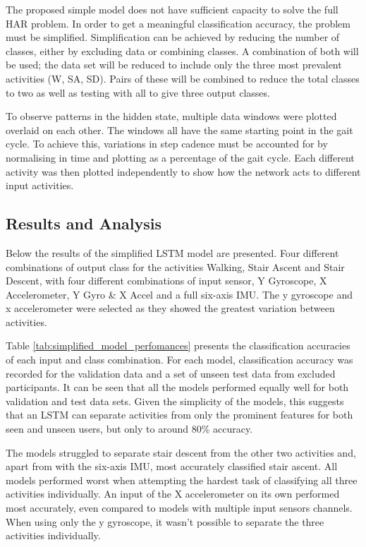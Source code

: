 \documentclass[sensors,article,submit,moreauthors,pdftex]{Definitions/mdpi}
\begin{document}
The proposed simple model does not have sufficient capacity to solve the full HAR problem. In order to get a meaningful classification accuracy, the problem must be simplified. Simplification can be achieved by reducing the number of classes, either by excluding data or combining classes. A combination of both will be used; the data set will be reduced to include only the three most prevalent activities (W, SA, SD). Pairs of these will be combined to reduce the total classes to two as well as testing with all to give three output classes.

To observe patterns in the hidden state, multiple data windows were plotted overlaid on each other. The windows all have the same starting point in the gait cycle. To achieve this, variations in step cadence must be accounted for by normalising in time and plotting as a percentage of the gait cycle. Each different activity was then plotted independently to show how the network acts to different input activities.

\subsection{Results and Analysis}
Below the results of the simplified LSTM model are presented. Four different combinations of output class for the activities Walking, Stair Ascent and Stair Descent, with four different combinations of input sensor, Y Gyroscope, X Accelerometer, Y Gyro \& X Accel and a full six-axis IMU. The y gyroscope and x accelerometer were selected as they showed the greatest variation between activities.

Table \ref{tab:simplified_model_perfomances} presents the classification accuracies of each input and class combination. For each model, classification accuracy was recorded for the validation data and a set of unseen test data from excluded participants. It can be seen that all the models performed equally well for both validation and test data sets. Given the simplicity of the models, this suggests that an LSTM can separate activities from only the prominent features for both seen and unseen users, but only to around 80\% accuracy.

The models struggled to separate stair descent from the other two activities and, apart from with the six-axis IMU, most accurately classified stair ascent. All models performed worst when attempting the hardest task of classifying all three activities individually. An input of the X accelerometer on its own performed most accurately, even compared to models with multiple input sensors channels. When using only the y gyroscope, it wasn't possible to separate the three activities individually.
\end{document}
